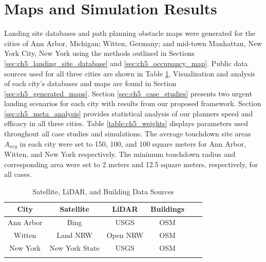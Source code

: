 \section{Maps and Simulation Results}\label{sec:ch5_experiments}

Landing site databases and path planning obstacle maps were generated for the cities of Ann Arbor, Michigan; Witten, Germany; and mid-town Manhattan, New York City, New York using the methods outlined in Sections \ref{sec:ch5_landing_site_database} and \ref{sec:ch5_occupancy_map}. Public data sources used for all three cities are shown in Table \ref{table:ch5_data_sources}. Visualization and analysis of each city's databases and maps are found in Section \ref{sec:ch5_generated_maps}. Section \ref{sec:ch5_case_studies} presents two urgent landing scenarios for each city with results from our proposed framework. Section \ref{sec:ch5_meta_analysis} provides statistical analysis of our planners speed and efficacy in all three cities. Table \ref{table:ch5_weights} displays parameters used throughout all case studies and simulations. The average touchdown site areas $A_{avg}$ in each city were set to 150, 100, and 100 square meters for Ann Arbor, Witten, and New York respectively. The minimum touchdown radius and corresponding area were set to 2 meters and 12.5 square meters, respectively, for all cases.

\begin{table}[ht]
\centering
\caption{Satellite, LiDAR, and Building Data Sources}\label{table:ch5_data_sources}
\begin{tabular}{c@{\qquad}cc@{\qquad}cc@{\qquad}c}
  \hline\noalign{\smallskip}
  City & Satellite & LiDAR & Buildings \\
  \hline\noalign{\smallskip}
  Ann Arbor & Bing \cite{satellite_annarbor}            & USGS \cite{usgs_lidar_2018-annarbor}       & \ac{OSM}\cite{openstreetmap_contributors_planet_2017}  \\
  Witten    & Land NRW \cite{satellite_germany}         & Open NRW \cite{lidar_germany}    & \ac{OSM}\cite{openstreetmap_contributors_planet_2017}  \\
  New York  & New York State \cite{satellite_newyork}   & USGS \cite{usgs_lidar_2018_ny}        & \ac{OSM}\cite{openstreetmap_contributors_planet_2017}  \\
\noalign{\smallskip}\hline\noalign{\smallskip}
\end{tabular}
\end{table}


